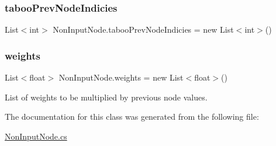 \subsubsection{\texorpdfstring{taboo\+Prev\+Node\+Indicies}{tabooPrevNodeIndicies}}
{\footnotesize\ttfamily List$<$int$>$ Non\+Input\+Node.\+taboo\+Prev\+Node\+Indicies = new List$<$int$>$()}

\mbox{\label{class_non_input_node_a4c2ddced3cd3b741bbf5253dd69661d2}} 
\subsubsection{\texorpdfstring{weights}{weights}}
{\footnotesize\ttfamily List$<$float$>$ Non\+Input\+Node.\+weights = new List$<$float$>$()}



List of weights to be multiplied by previous node values. 



The documentation for this class was generated from the following file\+:\begin{DoxyCompactItemize}
\item 
\mbox{\hyperlink{_non_input_node_8cs}{Non\+Input\+Node.\+cs}}\end{DoxyCompactItemize}
